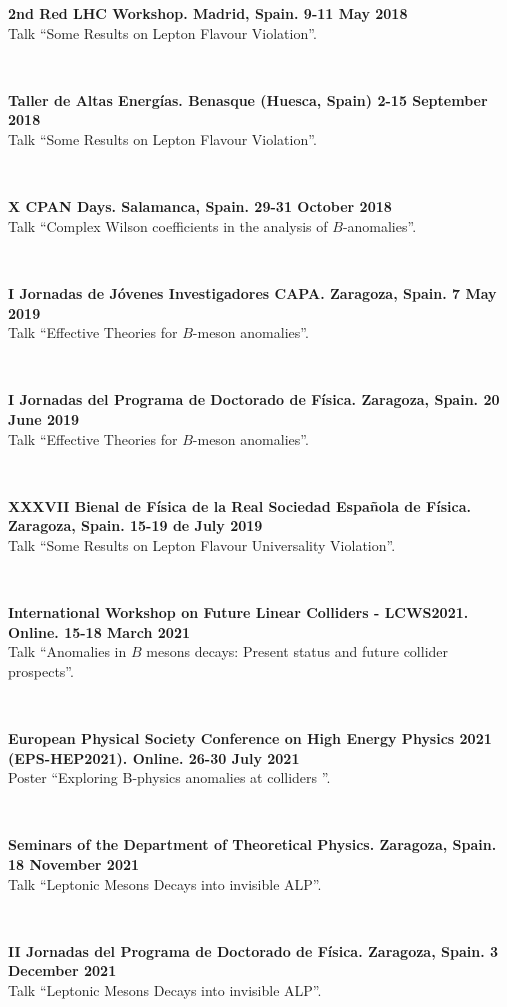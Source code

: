 \documentclass{cvf}
\begin{document}
\hspace{\parindent}\textbf{2nd Red LHC Workshop. Madrid, Spain. 9-11 May 2018}\\
Talk ``Some Results on Lepton Flavour Violation''.

~

\textbf{Taller de Altas Energías. Benasque (Huesca, Spain) 2-15 September 2018}\\
Talk ``Some Results on Lepton Flavour Violation''.

~

\textbf{X CPAN Days. Salamanca, Spain. 29-31 October 2018}\\
Talk ``Complex Wilson coefficients in the analysis of $B$-anomalies''.

~

\textbf{I Jornadas de Jóvenes Investigadores CAPA. Zaragoza, Spain. 7 May 2019}\\
Talk ``Effective Theories for $B$-meson anomalies''.

~

\textbf{I Jornadas del Programa de Doctorado de Física. Zaragoza, Spain. 20 June 2019}\\
Talk ``Effective Theories for $B$-meson anomalies''.

~

\textbf{XXXVII Bienal de Física de la Real Sociedad Española de Física. Zaragoza, Spain. 15-19 de July 2019}\\
Talk ``Some Results on Lepton Flavour Universality Violation''.

~

\textbf{International Workshop on Future Linear Colliders - LCWS2021. Online. 15-18 March 2021}\\
Talk ``Anomalies in $B$ mesons decays: Present status and future collider prospects''.

~

\textbf{European Physical Society Conference on High Energy Physics 2021 (EPS-HEP2021). Online. 26-30 July 2021}\\
Poster ``Exploring B-physics anomalies at colliders ''.

~

\textbf{Seminars of the Department of Theoretical Physics. Zaragoza, Spain. 18 November 2021}\\
Talk ``Leptonic Mesons Decays into invisible ALP''.

~

\textbf{II Jornadas del Programa de Doctorado de Física. Zaragoza, Spain. 3 December 2021}\\
Talk ``Leptonic Mesons Decays into invisible ALP''.
\end{document}
